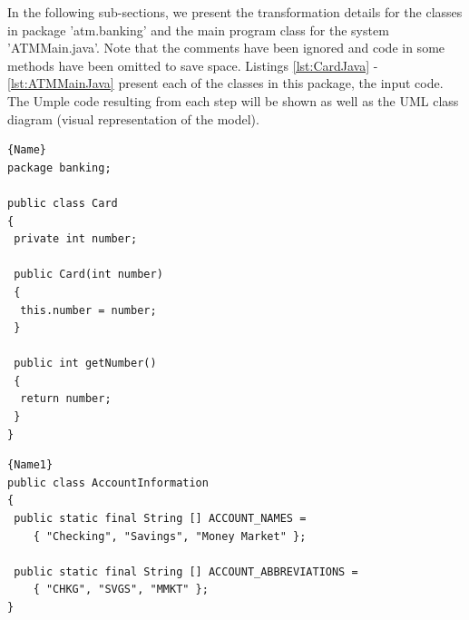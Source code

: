 In the following sub-sections, we present the transformation details for the classes in package 'atm.banking' and the main program class for the system 'ATMMain.java'. Note that the comments have been ignored and code in some methods have been omitted to save space.  Listings \ref{lst:CardJava} - \ref{lst:ATMMainJava} present each of the classes in this package, the input code. The Umple code resulting from each step will be shown as well as the UML class diagram (visual representation of the model). 

\noindent\begin{minipage}{.45\textwidth}
\begin{lstlisting}[style=java,caption=Card.java,label=lst:CardJava]{Name}
package banking;

public class Card
{
 private int number;
    
 public Card(int number)
 {
  this.number = number;
 }
    
 public int getNumber()
 {
  return number;
 }   
}
\end{lstlisting}
\end{minipage}\hfill
\begin{minipage}{.45\textwidth}
\begin{lstlisting}[style=java,caption=AccountInfo.java,label=lst:AccountInformation]{Name1}
public class AccountInformation
{
 public static final String [] ACCOUNT_NAMES =
    { "Checking", "Savings", "Money Market" };
         
 public static final String [] ACCOUNT_ABBREVIATIONS =
    { "CHKG", "SVGS", "MMKT" };
}    
\end{lstlisting}
\end{minipage}


